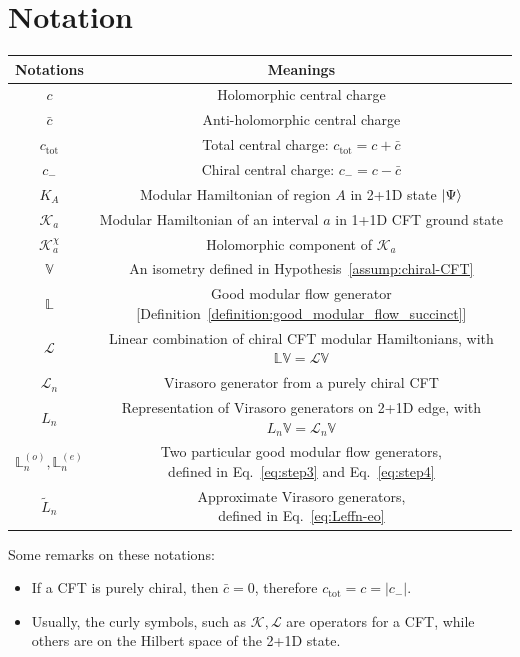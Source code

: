 \documentclass[12pt, nofootinbib]{article}
\theoremstyle{plain}
\theoremstyle{assumption}
\theoremstyle{definition}
\theoremstyle{plain}
\theoremstyle{plain}
\theoremstyle{plain}
\theoremstyle{plain}
\theoremstyle{plain}
\def\Lb{\mathbb{L}}
\def\Lbe{\mathbb{L}^{(e)}}
\def\Lbo{\mathbb{L}^{(o)}}
\def\Leff{\widetilde{L}}
\def\Kcft{\mathscr{K}}
\def\Lcft{\mathscr{L}}
\def\ctot{c_{\mathrm{tot}}}
\begin{document}
\section{Notation}
\begin{center}
\begin{tabular}{|c|c|}
\hline 
Notations & Meanings  \\ \hline \hline
$c$ & Holomorphic central charge \\ \hline
$\bar c$ & Anti-holomorphic central charge \\ \hline
$\ctot$ & Total central charge: $\ctot=c+\bar{c}$ \\ \hline
$c_{-}$ & Chiral central charge: $c_{-} = c-\bar c$ \\ \hline \hline
$K_A$ & Modular Hamiltonian of region $A$ in 2+1D state $\left|\Psi\right\rangle$ \\ \hline
$\Kcft_a$ & Modular Hamiltonian of an interval $a$ in 1+1D CFT ground state \\ \hline 
$\Kcft_a^{\chi}$ & Holomorphic component of $\Kcft_a$ \\ \hline \hline 
$\mathbb{V}$ & An isometry defined in Hypothesis~\ref{assump:chiral-CFT} \\ \hline
$\Lb$ & Good modular flow generator [Definition~\ref{definition:good_modular_flow_succinct}] \\ \hline
$\Lcft$ & \makecell{Linear combination of chiral CFT modular Hamiltonians,\\ with $\Lb\mathbb{V} = \Lcft\mathbb{V}$} \\ \hline
$\Lcft_n$ & Virasoro generator from a purely chiral CFT \\ \hline 
$L_n$ & \makecell{Representation of Virasoro generators on 2+1D edge, \\ with $L_n\mathbb{V} = \Lcft_n\mathbb{V}$} \\ \hline 
$\Lbo_n,\Lbe_n$ & \makecell{Two particular good modular flow generators, \\ defined in Eq.~\eqref{eq:step3} and Eq.~\eqref{eq:step4}} \\ \hline 
$\Leff_n$ & \makecell{Approximate Virasoro generators,\\ defined in Eq.~\eqref{eq:Leffn-eo}} \\ \hline 
\end{tabular}
\end{center}
Some remarks on these notations: 
\begin{itemize}
    \item If a CFT is purely chiral, then $\bar c=0$, therefore $\ctot = c = |c_{-}|$. 
    \item Usually, the curly symbols, such as $\Kcft, \Lcft$ are operators for a CFT, while others are on the Hilbert space of the 2+1D state.    
\end{itemize}
\end{document}
